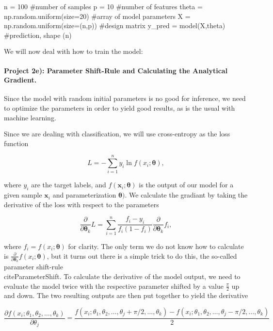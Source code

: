 \documentclass[%
oneside,                 %
final,                   %
10pt]{article}
\begin{document}
\bpycod
n = 100 #number of samples
p = 10 #number of features
theta = np.random.uniform(size=20) #array of model parameters
X = np.random.uniform(size=(n,p)) #design matrix
y_pred = model(X,theta) #prediction, shape (n)
\epycod



We will now deal with how to train the model:

\paragraph{Project 2e): Parameter Shift-Rule and Calculating the Analytical Gradient.}
Since the model with random initial parameters is no good for
inference, we need to optimize the parameters in order to yield good
results, as is the usual with machine learning.

Since we are dealing with classification, we will use cross-entropy as the loss function

\begin{equation*}
    L = -\sum_{i=1}^{n}{y_i \ln{f(x_i;\boldsymbol{\theta})}},
\end{equation*}

where $y_i$ are the target labels, and
$f(\boldsymbol{x}_i;\boldsymbol{\theta})$ is the output of our model
for a given sample $\boldsymbol{x}_i$ and parameterization
$\boldsymbol{\theta})$. We calculate the gradiant by taking the
derivative of the loss with respect to the parameters

\begin{equation*}
    \frac{\partial}{\partial \boldsymbol{\theta}_k}L = \sum_{i=1}^{n}{\frac{f_i - y_i}{f_i(1 - f_i)}} \frac{\partial}{\partial \boldsymbol{\theta}_k}f_i,
\end{equation*}

where $f_i = f(x_i;\boldsymbol{\theta})$ for clarity. The only term we do not know how to calculate is $\frac{\partial}{\partial \boldsymbol{\theta}_k}f(x_i;\boldsymbol{\theta})$, but it turns out there is a simple trick to do this, the so-called parameter shift-rule \\cite{ParameterShift}. To calculate the derivative of the model output, we need to evaluate the model twice with the respective parameter shifted by a value $\frac{\pi}{2}$ up and down. The two resulting outputs are then put together to yield the derivative



\begin{equation*}
    \frac{\partial f(x_i; \theta_1, \theta_2, \dots, \theta_k)}{\partial \theta_j}  = \frac{f(x_i; \theta_1, \theta_2, \dots, \theta_j + \pi /2, \dots, \theta_k) -f(x_i; \theta_1, \theta_2, \dots, \theta_j - \pi /2, \dots, \theta_k)}{2}
\end{equation*}
\end{document}
